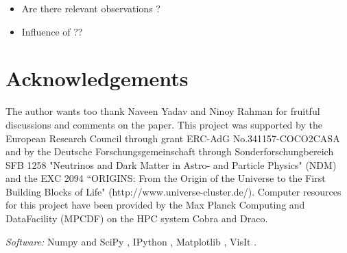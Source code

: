 \documentclass[fleqn,usenatbib]{mnras}
\newcommand{\COM}[1]{{\color{orange}#1}}
\begin{document}
\COM{
\begin{itemize}
    \item Are there relevant observations ?
    \item Influence of \cite{Jones2019} ??
\end{itemize}
}

\section*{Acknowledgements}
The author wants too thank Naveen Yadav and Ninoy Rahman for fruitful discussions and comments on the paper. This project was supported by the European Research Council through grant ERC-AdG No.341157-COCO2CASA and by the Deutsche Forschungsgemeinschaft through Sonderforschungbereich SFB 1258 "Neutrinos and Dark Matter in Astro- and Particle Physics" (NDM) and the EXC 2094 “ORIGINS:
From the Origin of the Universe to the First Building
Blocks of Life" (http://www.universe-cluster.de/). Computer resources for this project have been provided by  the Max Planck Computing and DataFacility (MPCDF) on the HPC system Cobra and Draco.

\textit{Software:} Numpy and SciPy \citet{Jones2001}, IPython \citet{Perez2007}, Matplotlib \citet{Hunter2007}, VisIt \citet{Childs2012}.



\newpage
\appendix
\end{document}

